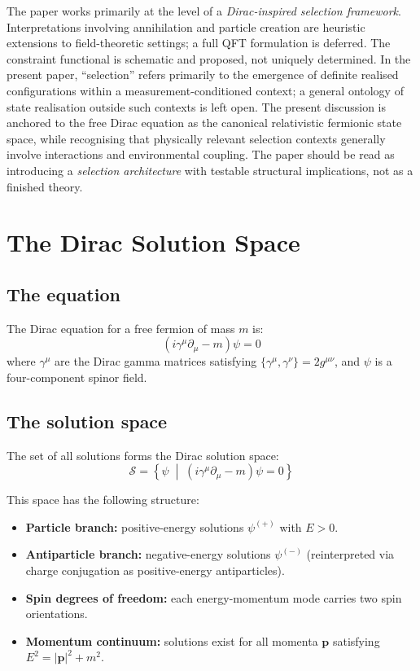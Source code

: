 \documentclass[12pt]{article}
\begin{document}
The paper works primarily at the level of a \textit{Dirac-inspired selection framework}. Interpretations involving annihilation and particle creation are heuristic extensions to field-theoretic settings; a full QFT formulation is deferred. The constraint functional is schematic and proposed, not uniquely determined. In the present paper, ``selection'' refers primarily to the emergence of definite realised configurations within a measurement-conditioned context; a general ontology of state realisation outside such contexts is left open. The present discussion is anchored to the free Dirac equation as the canonical relativistic fermionic state space, while recognising that physically relevant selection contexts generally involve interactions and environmental coupling. The paper should be read as introducing a \textit{selection architecture} with testable structural implications, not as a finished theory.

\section{The Dirac Solution Space}\label{sec:dirac}

\subsection{The equation}

The Dirac equation for a free fermion of mass $m$ is:
\begin{equation}\label{eq:dirac}
    (i\gamma^\mu \partial_\mu - m)\psi = 0
\end{equation}
where $\gamma^\mu$ are the Dirac gamma matrices satisfying $\{\gamma^\mu, \gamma^\nu\} = 2g^{\mu\nu}$, and $\psi$ is a four-component spinor field.

\subsection{The solution space}

The set of all solutions forms the Dirac solution space:
\begin{equation}\label{eq:solspace}
    \mathcal{S} = \left\{ \psi \;\middle|\; (i\gamma^\mu \partial_\mu - m)\psi = 0 \right\}
\end{equation}

This space has the following structure:
\begin{itemize}
    \item \textbf{Particle branch:} positive-energy solutions $\psi^{(+)}$ with $E > 0$.
    \item \textbf{Antiparticle branch:} negative-energy solutions $\psi^{(-)}$ (reinterpreted via charge conjugation as positive-energy antiparticles).
    \item \textbf{Spin degrees of freedom:} each energy-momentum mode carries two spin orientations.
    \item \textbf{Momentum continuum:} solutions exist for all momenta $\mathbf{p}$ satisfying $E^2 = |\mathbf{p}|^2 + m^2$.
\end{itemize}
\end{document}
